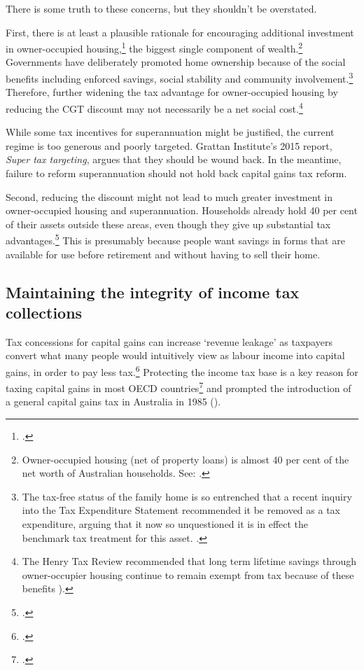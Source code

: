 There is some truth to these concerns, but they shouldn’t be overstated. 

First, there is at least a plausible rationale\label{subsubsect:plausible-rational-for-encouraging-investment-in-owner-occupied-housing}
 for encouraging additional investment in owner-occupied housing,\footcite[][43--45]{DaleyMcGannonSavageEtAl2013BalancingBudgets} the biggest single component of wealth.\footnote{Owner-occupied housing (net of property loans) is almost 40 per cent of the net worth of Australian households. See: \textcite[][]{ABS2015HousingFinance}.} Governments have deliberately promoted home ownership because of the social benefits including enforced savings, social stability and community involvement.\footnote{The tax-free status of the family home is so entrenched that a recent inquiry into the Tax Expenditure Statement recommended it be removed as a tax expenditure, arguing that it now so unquestioned it is in effect the benchmark tax treatment for this asset. \textcite[][42]{HouseOfRepresentativesStandingCommitteeonTaxRevenue2015TES}.} Therefore, further widening the tax advantage for owner-occupied housing by reducing the CGT discount may not necessarily be a net social cost.\footnote{The Henry Tax Review recommended that long term lifetime savings through owner-occupier housing continue to remain exempt from tax because of these benefits \textcite[][Part A, p.~4]{HenryTaxReview2010}).}


While some tax incentives for superannuation might be justified, the current regime is too generous and poorly targeted. Grattan Institute’s 2015 report, \textit{Super tax targeting}, argues that they should be wound back. %
In the meantime, failure to reform superannuation should not hold back capital gains tax reform. 

Second, reducing the discount might not lead to much greater investment in owner-occupied housing and superannuation. Households already hold 40 per cent of their assets outside these areas, even though they give up substantial tax advantages.\footcite{ABS2015HousingFinance} This is presumably because people want savings in forms that are available for use before retirement and without having to sell their home.  


\subsection{Maintaining the integrity of income tax collections}
Tax concessions for capital gains can increase ‘revenue leakage’ as taxpayers convert what many people would intuitively view as labour income into capital gains, in order to pay less tax.\footcites{Evans2005}{MinasLim2013} Protecting the income tax base is a key reason for taxing capital gains in most OECD countries\footcite{OECD2006TaxationOfCapitalGains}  and prompted the introduction of a general capital gains tax in Australia in 1985 (). 

